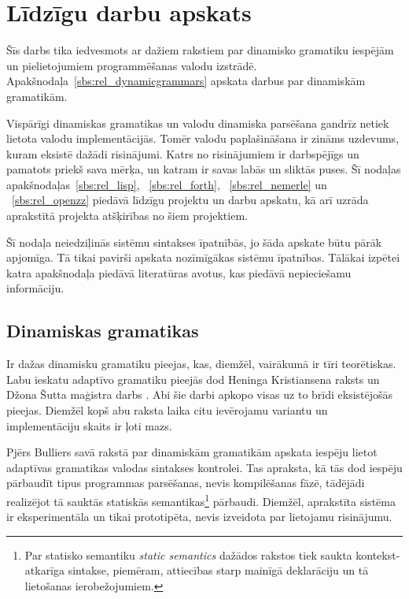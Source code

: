 \section{Līdzīgu darbu apskats}
\label{s:related}

Šīs darbs tika iedvesmots ar dažiem rakstiem par dinamisko gramatiku iespējām un pielietojumiem programmēšanas valodu izstrādē. Apakšnodaļa~\ref{sbs:rel_dynamicgrammars} apskata darbus par dinamiskām gramatikām. 

Vispārīgi dinamiskas gramatikas un valodu dinamiska parsēšana gandrīz netiek lietota valodu implementācijās. Tomēr valodu paplašināšana ir zināms uzdevums, kuram eksistē dažādi risinājumi. Katrs no risinājumiem ir darbspējīgs un pamatots priekš sava mērķa, un katram ir savas labās un sliktās puses. Šī nodaļas apakšnodaļas~\ref{sbs:rel_lisp}, ~\ref{sbs:rel_forth}, ~\ref{sbs:rel_nemerle} un ~\ref{sbs:rel_openzz} piedāvā līdzīgu projektu un darbu apskatu, kā arī uzrāda aprakstītā projekta atšķirības no šiem projektiem.

Šī nodaļa neiedziļinās sistēmu sintakses īpatnībās, jo šāda apskate būtu pārāk apjomīga. Tā tikai pavirši apskata nozīmīgākas sistēmu īpatnības. Tālākai izpētei katra apakšnodaļa piedāvā literatūras avotus, kas piedāvā nepieciešamu informāciju.

\subsection{\label{sbs:rel_dynamicgrammars}Dinamiskas gramatikas}

Ir dažas dinamisku gramatiku pieejas, kas, diemžēl, vairākumā ir tīri teorētiskas. Labu ieskatu adaptīvo gramatiku pieejās dod Heninga Kristiansena raksts \cite{Christiansen:SurveyAdaptableGrammars} un Džona Šutta maģistra darbs \cite{Shutt:AdaptiveGrammars}. Abi šie darbi apkopo visas uz to brīdi eksistējošās pieejas. Diemžēl kopš abu raksta laika citu ievērojamu variantu un implementāciju skaits ir ļoti mazs.

Pjērs Bulliers savā rakstā par dinamiskām gramatikām \cite{Boullier:DynamicGrammars} apskata iespēju lietot adaptīvas gramatikas valodas sintakses kontrolei. Tas apraksta, kā tās dod iespēju pārbaudīt tipus programmas parsēšanas, nevis kompilēšanas fāzē, tādējādi realizējot tā sauktās statiskās semantikas\footnote{Par statisko semantiku \emph{static semantics} dažādos rakstos tiek saukta kontekst-atkarīga sintakse, piemēram, attiecības starp mainīgā deklarāciju un tā lietošanas ierobežojumiem.} pārbaudi. Diemžēl, aprakstīta sistēma ir eksperimentāla un tikai prototipēta, nevis izveidota par lietojamu risinājumu.

